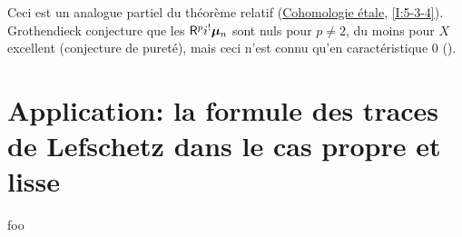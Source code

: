 Ceci est un analogue partiel du th\'eor\`eme relatif 
(\hyperref[I]{Cohomologie \'etale}, \ref{I:5-3-4}). Grothendieck conjecture 
que les $\mathsf{R}^p i^! {\bm\mu}_n$ sont nuls pour $p\ne 2$, du moins pour $X$ excellent 
(conjecture de puret\'e), mais ceci n'est connu qu'en caract\'eristique $0$ 
(\cite[XIX]{sga4}). 










\section{Application: la formule des traces de Lefschetz dans le cas propre et lisse}\label{IV:3}

\begin{corollary_}\label{IV:3-7}
foo
\end{corollary_}